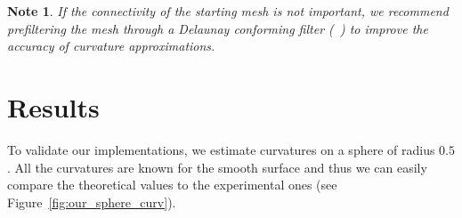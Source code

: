 \documentclass{InsightArticle}
\theoremstyle{plain}
\newtheorem*{note}{Note}
\begin{document}
%
%
%
%
%
%
%
\begin{note}
If the connectivity of the starting mesh is not important, we recommend prefiltering the mesh through a Delaunay conforming filter (~\cite{itkDelaunayConform}) to improve the accuracy of curvature approximations.
\end{note}

\section{Results}
\label{sec:Results}

To validate our implementations, we estimate curvatures on a sphere of radius $0.5$. All the curvatures are known for the smooth surface and thus we can easily compare the theoretical values to the experimental ones (see Figure~\ref{fig:our_sphere_curv}).
\end{document}

